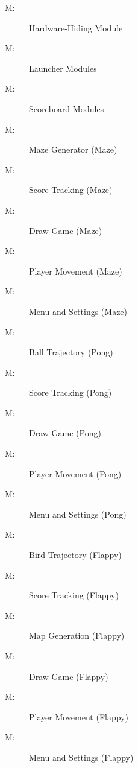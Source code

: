 \documentclass[12pt, titlepage]{article}
\newcounter{mnum}
\newcommand{\mthemnum}{M\themnum}
\begin{document}
\begin{description}
\item [ \mthemnum \label{mHH}:] Hardware-Hiding Module
\item [ \mthemnum \label{mLM}:] Launcher Modules
\item [ \mthemnum \label{mSM}:] Scoreboard Modules
\item [ \mthemnum \label{mMGM}:] Maze Generator (Maze)
\item [ \mthemnum \label{mSTM}:] Score Tracking (Maze)
\item [ \mthemnum \label{mDGM}:] Draw Game (Maze) 
\item [ \mthemnum \label{mPMM}:] Player Movement (Maze)
\item [ \mthemnum \label{mMSM}:] Menu and Settings (Maze) 
\item [ \mthemnum \label{mBTP}:] Ball Trajectory (Pong)
\item [ \mthemnum \label{mSTP}:] Score Tracking (Pong) 
\item [ \mthemnum \label{mDGP}:] Draw Game (Pong)
\item [ \mthemnum \label{mPMP}:] Player Movement (Pong)
\item [ \mthemnum \label{mMSP}:] Menu and Settings (Pong)
\item [ \mthemnum \label{mBDF}:] Bird Trajectory (Flappy)
\item [ \mthemnum \label{mSTF}:] Score Tracking (Flappy)
\item [ \mthemnum \label{mMGF}:] Map Generation (Flappy)
\item [ \mthemnum \label{mDGF}:] Draw Game (Flappy)
\item [ \mthemnum \label{mPMF}:] Player Movement (Flappy) 
\item [ \mthemnum \label{mMSF}:] Menu and Settings (Flappy)

\end{description}

\newpage
\end{document}
